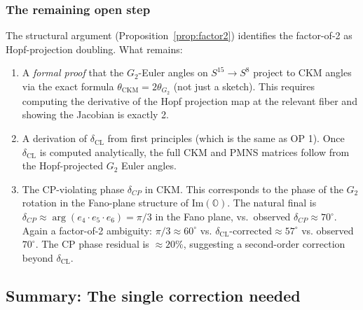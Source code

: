 \subsubsection{The remaining open step}

\begin{remark}
The structural argument (Proposition~\ref{prop:factor2}) identifies
the factor-of-2 as Hopf-projection doubling. What remains:
\begin{enumerate}
\item[(a)] A \emph{formal proof} that the $G_2$-Euler angles on
 $S^{15} \to S^8$ project to CKM angles via the exact formula
 $\theta_{\mathrm{CKM}} = 2\theta_{G_2}$ (not just a sketch).
 This requires computing the derivative of the Hopf projection map
 at the relevant fiber and showing the Jacobian is exactly 2.
\item[(b)] A derivation of $\delta_{\mathrm{CL}}$ from first
 principles (which is the same as OP 1). Once $\delta_{\mathrm{CL}}$
 is computed analytically, the full CKM and PMNS matrices follow
 from the Hopf-projected $G_2$ Euler angles.
\item[(c)] The CP-violating phase $\delta_{CP}$ in CKM. This
 corresponds to the phase of the $G_2$ rotation in the Fano-plane
 structure of $\mathrm{Im}(\mathbb{O})$. The natural final is
 $\delta_{CP} \approx \arg(e_4 \cdot e_5 \cdot e_6) = \pi/3$ in
 the Fano plane, vs.\ observed $\delta_{CP} \approx 70^\circ$.
 Again a factor-of-2 ambiguity: $\pi/3 \approx 60^\circ$ vs. $\delta_{\mathrm{CL}}\text{-corrected} \approx 57^\circ$ vs. observed $70^\circ$. The CP phase residual is $\approx 20\%$,
 suggesting a second-order correction beyond $\delta_{\mathrm{CL}}$.
\end{enumerate}
\end{remark}

\subsection{Summary: The single correction needed}

